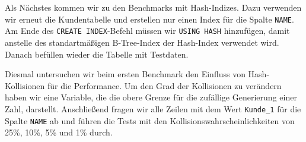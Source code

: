 Als Nächstes kommen wir zu den Benchmarks mit Hash-Indizes.
Dazu verwenden wir erneut die Kundentabelle und erstellen nur einen Index für die Spalte \texttt{NAME}.
Am Ende des \texttt{CREATE INDEX}-Befehl müssen wir \texttt{USING HASH} hinzufügen, damit anstelle des standartmäßigen B-Tree-Index der Hash-Index verwendet wird.
Danach befüllen wieder die Tabelle mit Testdaten.

Diesmal untersuchen wir beim ersten Benchmark den Einfluss von Hash-Kollisionen für die Performance.
Um den Grad der Kollisionen zu verändern haben wir eine Variable, die die obere Grenze für die zufällige Generierung einer Zahl, darstellt.
Anschließend fragen wir alle Zeilen mit dem Wert \texttt{Kunde\_1} für die Spalte \texttt{NAME} ab und führen die Tests mit den Kollisionswahrscheinlichkeiten von 25\%, 10\%, 5\% und 1\% durch.

